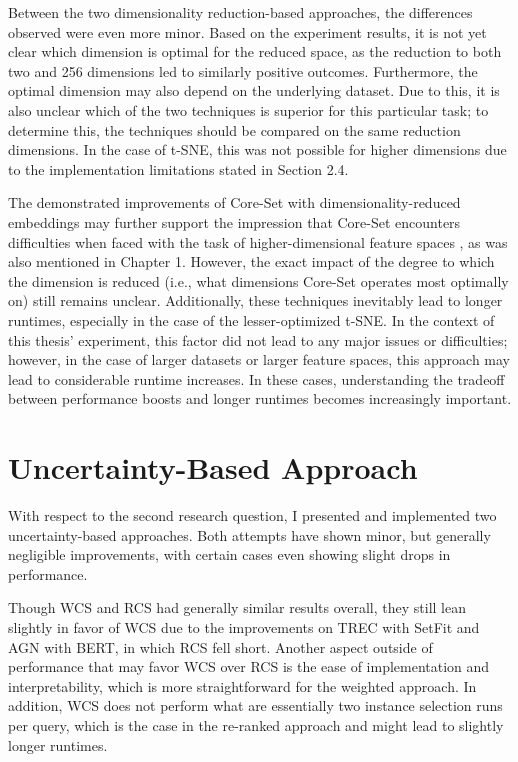 \documentclass[english,bachelor,ul]{webisthesis} %
\begin{document}
Between the two dimensionality reduction-based approaches, the differences observed were even more minor. Based on the experiment results, it is not yet clear which dimension is optimal for the reduced space, as the reduction to both two and 256 dimensions led to similarly positive outcomes. Furthermore, the optimal dimension may also depend on the underlying dataset. Due to this, it is also unclear which of the two techniques is superior for this particular task; to determine this, the techniques should be compared on the same reduction dimensions. In the case of t-SNE, this was not possible for higher dimensions due to the implementation limitations stated in Section 2.4. 

The demonstrated improvements of Core-Set with dimensionality-reduced embeddings may further support the impression that Core-Set encounters difficulties when faced with the task of higher-dimensional feature spaces \citep{DBLP:conf/iccv/SinhaED19}, as was also mentioned in Chapter 1. However, the exact impact of the degree to which the dimension is reduced (i.e., what dimensions Core-Set operates most optimally on) still remains unclear. Additionally, these techniques inevitably lead to longer runtimes, especially in the case of the lesser-optimized t-SNE. In the context of this thesis' experiment, this factor did not lead to any major issues or difficulties; however, in the case of larger datasets or larger feature spaces, this approach may lead to considerable runtime increases. In these cases, understanding the tradeoff between performance boosts and longer runtimes becomes increasingly important. 

\section{Uncertainty-Based Approach}

With respect to the second research question, I presented and implemented two uncertainty-based approaches.  
Both attempts have shown minor, but generally negligible improvements, with certain cases even showing slight drops in performance. 

Though WCS and RCS had generally similar results overall, they still lean slightly in favor of WCS due to the improvements on TREC with SetFit and AGN with BERT, in which RCS fell short. Another aspect outside of performance that may favor WCS over RCS is the ease of implementation and interpretability, which is more straightforward for the weighted approach. In addition, WCS does not perform what are essentially two instance selection runs per query, which is the case in the re-ranked approach and might lead to slightly longer runtimes. 
\end{document}
